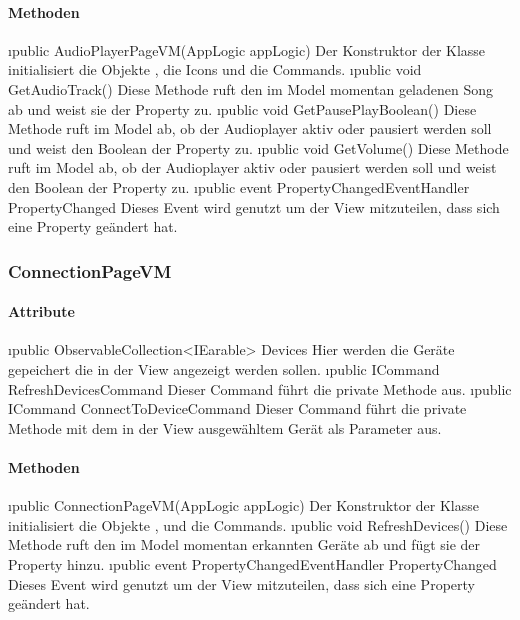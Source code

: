 \documentclass[../entwurf.tex]{subfiles}
\begin{document}
\paragraph{Methoden}
\begin{itemize}
	\i{public AudioPlayerPageVM(AppLogic appLogic)} Der Konstruktor der Klasse initialisiert die Objekte , die Icons und die Commands.
	\i{public void GetAudioTrack()} Diese Methode ruft den im Model momentan geladenen Song ab und weist sie der Property  zu.
	\i{public void GetPausePlayBoolean()} Diese Methode ruft im Model ab, ob der Audioplayer aktiv oder pausiert werden soll und weist den Boolean der Property  zu.
	\i{public void GetVolume()} Diese Methode ruft im Model ab, ob der Audioplayer aktiv oder pausiert werden soll und weist den Boolean der Property  zu.
	\i{public event PropertyChangedEventHandler PropertyChanged} Dieses Event wird genutzt um der View mitzuteilen, dass sich eine Property geändert hat.
\end{itemize}
\subsubsection{ConnectionPageVM}
\paragraph{Attribute}
\begin{itemize}
	\i{public ObservableCollection<IEarable> Devices} Hier werden die Geräte gepeichert die in der View angezeigt werden sollen.
	\i{public ICommand RefreshDevicesCommand} Dieser Command führt die private Methode  aus.
	\i{public ICommand ConnectToDeviceCommand} Dieser Command führt die private Methode  mit dem in der View ausgewähltem Gerät als Parameter aus.
\end{itemize}
\paragraph{Methoden}
\begin{itemize}
	\i{public ConnectionPageVM(AppLogic appLogic)} Der Konstruktor der Klasse initialisiert die Objekte ,  und die Commands.
	\i{public void RefreshDevices()} Diese Methode ruft den im Model momentan erkannten Geräte ab und fügt sie der Property  hinzu.
	\i{public event PropertyChangedEventHandler PropertyChanged} Dieses Event wird genutzt um der View mitzuteilen, dass sich eine Property geändert hat.
\end{itemize}
\end{document}
